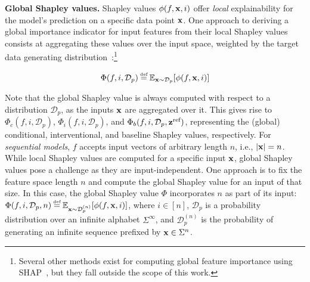 
\textbf{Global Shapley values.} Shapley values $\phi(f,\textbf{x},i)$ offer \emph{local} explainability for the model's prediction on a specific data point $\textbf{x}$. One approach to deriving a global importance indicator for input features from their local Shapley values consists at aggregating these values over the input space, weighted by the target data generating distribution~\citep{frye20}:\footnote{Several other methods exist for computing global feature importance using SHAP~\citep{covert2020understanding, lundberg2017, lundbergnature}, but they fall outside the scope of this work.}

\begin{equation}
  \label{eq:VBshap}
   \Phi(f,i, \mathcal{D}_p) \myeq \mathbb{E}_{\x \sim \mathcal{D}_p}[\phi(f,\x,i)]
\end{equation}



Note that the global Shapley value is always computed with respect to a distribution $\mathcal{D}_p$, as the inputs $\textbf{x}$ are aggregated over it. This gives rise to $\Phi_c(f,i,\mathcal{D}_p)$, $\Phi_i(f,i,\mathcal{D}_p)$, and $\Phi_b(f,i,\mathcal{D}_p,\textbf{z}^{\text{ref}})$, representing the (global) conditional, interventional, and baseline Shapley values, respectively. For \emph{sequential models}, $f$ accepts input vectors of arbitrary length $n$, i.e., $|\textbf{x}|=n$. While local Shapley values are computed for a specific input $\textbf{x}$, global Shapley values pose a challenge as they are input-independent. One approach is to fix the feature space length $n$ and compute the global Shapley value for an input of that size. In this case, the global Shapley value $\Phi$ incorporates $n$ as part of its input: $\Phi(f,i,\mathcal{D}_p,n) \myeq \mathbb{E}_{\x \sim \mathcal{D}_p^{(n)}}[\phi(f,\x,i)]$, where $i \in [n]$, $\mathcal{D}_p$ is a probability distribution over an infinite alphabet $\Sigma^{\infty}$, and $\mathcal{D}_p^{(n)}$ is the probability of generating an infinite sequence prefixed by $\textbf{x} \in \Sigma^{n}$.



